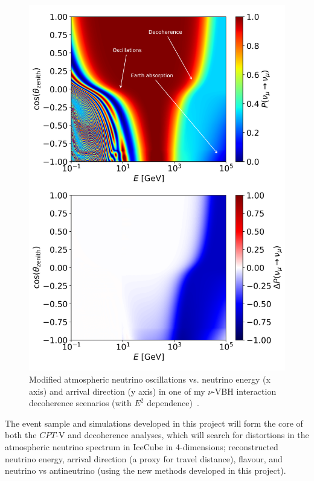 \documentclass[a4paper,11pt]{article}
\begin{document}
\begin{figure} %
    \centering
    \vspace{-7pt}
    \includegraphics[trim=0.0cm 12.7cm 0.cm 0.2cm, clip=true, width=1.\linewidth]{images/atmo_oscillogram_randomize_flavor_n2_matter.png}
    \caption{Modified atmospheric neutrino oscillations vs. neutrino energy (x axis) and arrival direction (y axis) in one of my $\nu$-VBH interaction decoherence scenarios (with $E^2$ dependence)~\cite{PhysRevD.102.115003}.}
    \vspace{-15pt}
    \label{fig:decoh_oscillogram}
\end{figure}

The event sample and simulations developed in this project will form the core of both the $CPT$-V and decoherence analyses, which will search for distortions in the atmospheric neutrino spectrum in IceCube in 4-dimensions; reconstructed neutrino energy, arrival direction (a proxy for travel distance), flavour, and neutrino vs antineutrino (using the new methods developed in this project).
\end{document}
